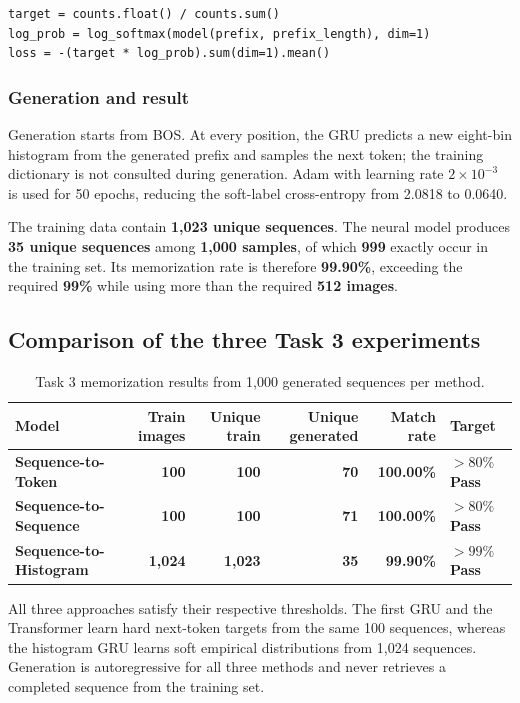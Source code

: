 \documentclass[11pt]{article}
\newcommand{\pass}{\textcolor{codegreen}{\textbf{Pass}}}
\newcommand{\keydata}[1]{\textbf{#1}}
\newcommand{\keyarch}[1]{\textcolor{codeblue}{\textbf{#1}}}
\begin{document}
\begin{lstlisting}
target = counts.float() / counts.sum()
log_prob = log_softmax(model(prefix, prefix_length), dim=1)
loss = -(target * log_prob).sum(dim=1).mean()
\end{lstlisting}

\subsubsection{Generation and result}

Generation starts from BOS. At every position, the GRU predicts a new eight-bin histogram from the generated prefix and samples the next token; the training dictionary is not consulted during generation. Adam with learning rate $2\times10^{-3}$ is used for 50 epochs, reducing the soft-label cross-entropy from 2.0818 to 0.0640.

The training data contain \keydata{1,023 unique sequences}. The neural model produces \keydata{35 unique sequences} among \keydata{1,000 samples}, of which \keydata{999} exactly occur in the training set. Its memorization rate is therefore \keydata{99.90\%}, exceeding the required \keydata{99\%} while using more than the required \keydata{512 images}.

\subsection{Comparison of the three Task 3 experiments}

\begin{table}[H]
\centering
\caption{Task 3 memorization results from 1,000 generated sequences per method.}
\small
\begin{tabularx}{\textwidth}{Xrrrrl}
\toprule
Model & Train images & Unique train & Unique generated & Match rate & Target \\
\midrule
\keyarch{Sequence-to-Token} & \keydata{100} & \keydata{100} & \keydata{70} & \keydata{100.00\%} & \keydata{$>80\%$} \pass \\
\keyarch{Sequence-to-Sequence} & \keydata{100} & \keydata{100} & \keydata{71} & \keydata{100.00\%} & \keydata{$>80\%$} \pass \\
\keyarch{Sequence-to-Histogram} & \keydata{1,024} & \keydata{1,023} & \keydata{35} & \keydata{99.90\%} & \keydata{$>99\%$} \pass \\
\bottomrule
\end{tabularx}
\end{table}

All three approaches satisfy their respective thresholds. The first GRU and the Transformer learn hard next-token targets from the same 100 sequences, whereas the histogram GRU learns soft empirical distributions from 1,024 sequences. Generation is autoregressive for all three methods and never retrieves a completed sequence from the training set.
\end{document}
